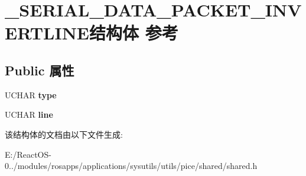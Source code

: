 \hypertarget{struct___s_e_r_i_a_l___d_a_t_a___p_a_c_k_e_t___i_n_v_e_r_t_l_i_n_e}{}\section{\+\_\+\+S\+E\+R\+I\+A\+L\+\_\+\+D\+A\+T\+A\+\_\+\+P\+A\+C\+K\+E\+T\+\_\+\+I\+N\+V\+E\+R\+T\+L\+I\+N\+E结构体 参考}
\label{struct___s_e_r_i_a_l___d_a_t_a___p_a_c_k_e_t___i_n_v_e_r_t_l_i_n_e}
\subsection*{Public 属性}
\begin{DoxyCompactItemize}
\item 
\mbox{\label{struct___s_e_r_i_a_l___d_a_t_a___p_a_c_k_e_t___i_n_v_e_r_t_l_i_n_e_a0bdec93fda6927abfbc71c7a569329fd}} 
U\+C\+H\+AR {\bfseries type}
\item 
\mbox{\label{struct___s_e_r_i_a_l___d_a_t_a___p_a_c_k_e_t___i_n_v_e_r_t_l_i_n_e_ad5061fbf709ec1e03769747db22bdb49}} 
U\+C\+H\+AR {\bfseries line}
\end{DoxyCompactItemize}


该结构体的文档由以下文件生成\+:\begin{DoxyCompactItemize}
\item 
E\+:/\+React\+O\+S-\/0../modules/rosapps/applications/sysutils/utils/pice/shared/shared.\+h\end{DoxyCompactItemize}

